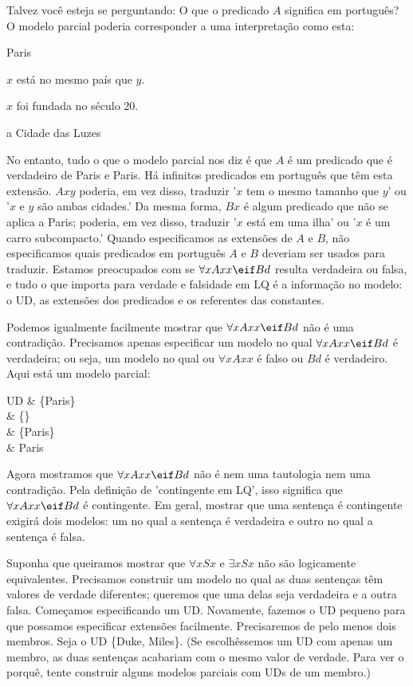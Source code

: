 Talvez você esteja se perguntando: O que o predicado $A$ significa em português? O modelo parcial poderia corresponder a uma interpretação como esta:
\begin{ekey}
\item[UD:] Paris
\item[$Axy$:] $x$ está no mesmo país que $y$.
\item[$Bx$:] $x$ foi fundada no século 20.
\item[$d$:] a Cidade das Luzes
\end{ekey}
No entanto, tudo o que o modelo parcial nos diz é que $A$ é um predicado que é verdadeiro de Paris e Paris. Há infinitos predicados em português que têm esta extensão. $Axy$ poderia, em vez disso, traduzir '$x$ tem o mesmo tamanho que $y$' ou '$x$ e $y$ são ambas cidades.' Da mesma forma, $Bx$ é algum predicado que não se aplica a Paris; poderia, em vez disso, traduzir '$x$ está em uma ilha' ou '$x$ é um carro subcompacto.' Quando especificamos as extensões de $A$ e $B$, não especificamos quais predicados em português $A$ e $B$ deveriam ser usados para traduzir. Estamos preocupados com se $\forall xAxx \eif Bd$ resulta verdadeira ou falsa, e tudo o que importa para verdade e falsidade em LQ é a informação no modelo: o UD, as extensões dos predicados e os referentes das constantes.

Podemos igualmente facilmente mostrar que $\forall xAxx \eif Bd$ não é uma contradição. Precisamos apenas especificar um modelo no qual $\forall xAxx \eif Bd$ é verdadeira; ou seja, um modelo no qual ou $\forall x Axx$ é falso ou $Bd$ é verdadeiro. Aqui está um modelo parcial:
\begin{partialmodel}
	UD			& \{Paris\}\\
	 	& \{\}\\
		& \{Paris\}\\
		& Paris
\end{partialmodel}

Agora mostramos que $\forall xAxx \eif Bd$ não é nem uma tautologia nem uma contradição. Pela definição de 'contingente em LQ', isso significa que 
$\forall xAxx \eif Bd$ é contingente. Em geral, mostrar que uma sentença é contingente exigirá dois modelos: um no qual a sentença é verdadeira e outro no qual a sentença é falsa.

Suponha que queiramos mostrar que $\forall x Sx$ e $\exists x Sx$ não são logicamente equivalentes. Precisamos construir um modelo no qual as duas sentenças têm valores de verdade diferentes; queremos que uma delas seja verdadeira e a outra falsa. Começamos especificando um UD. Novamente, fazemos o UD pequeno para que possamos especificar extensões facilmente. Precisaremos de pelo menos dois membros. Seja o UD \{Duke, Miles\}. (Se escolhêssemos um UD com apenas um membro, as duas sentenças acabariam com o mesmo valor de verdade. Para ver o porquê, tente construir alguns modelos parciais com UDs de um membro.)

